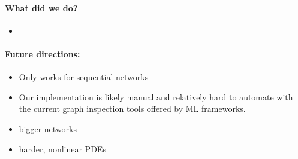
\paragraph{What did we do?}

\begin{itemize}
    \item 
\end{itemize}

\paragraph{Future directions:}
\begin{itemize}
\item Only works for sequential networks
\item Our implementation is likely manual and relatively hard to automate with the current graph inspection tools offered by ML frameworks.
\item bigger networks
\item harder, nonlinear PDEs 
\end{itemize}




